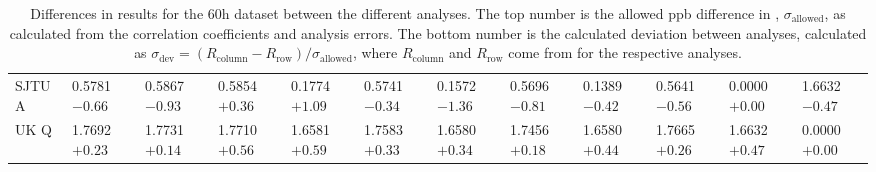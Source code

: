 \begin{landscape}
\begin{table}
\begin{tabularx}{1\linewidth}{@{\extracolsep{\fill}}lXXXXXXXXXXX}
	SJTU A & 0.5781 $-0.66$ & 0.5867 $-0.93$ & 0.5854 $+0.36$ & 0.1774 $+1.09$ & 0.5741 $-0.34$ & 0.1572 $-1.36$ & 0.5696 $-0.81$ & 0.1389 $-0.42$ & 0.5641 $-0.56$ & 0.0000 $+0.00$ & 1.6632 $-0.47$  \\
	UK Q   & 1.7692 $+0.23$ & 1.7731 $+0.14$ & 1.7710 $+0.56$ & 1.6581 $+0.59$ & 1.7583 $+0.33$ & 1.6580 $+0.34$ & 1.7456 $+0.18$ & 1.6580 $+0.44$ & 1.7665 $+0.26$ & 1.6632 $+0.47$ & 0.0000 $+0.00$  \\
  \bottomrule
\end{tabularx}
\caption[]{Differences in results for the 60h dataset between the different analyses. The top number is the allowed ppb difference in \R, $\sigma_{\text{allowed}}$, as calculated from the correlation coefficients and analysis errors. The bottom number is the calculated deviation between analyses, calculated as $\sigma_{\text{dev}} = (R_{\text{column}}-R_{\text{row}})/\sigma_{\text{allowed}}$, where $R_{\text{column}}$ and $R_{\text{row}}$ come from  for the respective analyses.}
\label{tab:60h_diff}
\end{table}
\end{landscape}




